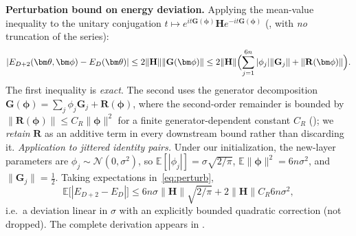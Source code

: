 \documentclass[11pt]{article}
\theoremstyle{plain}
\theoremstyle{plain}
\newcommand{\bbE}{\mathbb{E}}
\begin{document}
\medskip\noindent\textbf{Perturbation bound on energy deviation.}
Applying the mean-value inequality to the unitary conjugation
$t\mapsto e^{it\mathbf{G}(\bm\phi)}\mathbf{H}e^{-it\mathbf{G}(\bm\phi)}$
(, with \emph{no} truncation of the series):
\begin{equation}\label{eq:perturb}
  |E_{D+2}(\bm\theta,\bm\phi)-E_D(\bm\theta)|
  \le 2\|\mathbf{H}\| \|\mathbf{G}(\bm\phi)\|
  \le 2\|\mathbf{H}\|\Bigl(\sum_{j=1}^{6n}|\phi_j| \|\mathbf{G}_j\|
     +\|\mathbf{R}(\bm\phi)\|\Bigr).
\end{equation}
The first inequality is \emph{exact}.  The second uses the generator
decomposition $\mathbf{G}(\bm\phi)=\sum_j\phi_j\mathbf{G}_j+\mathbf{R}(\bm\phi)$, where the
second-order remainder is bounded by $\|\mathbf{R}(\bm\phi)\|\le C_R\|\bm\phi\|^2$
for a finite generator-dependent constant $C_R$ (); we
\emph{retain} $\mathbf{R}$ as an additive term in every downstream bound rather
than discarding it.
\emph{Application to jittered identity pairs.}  Under our
initialization, the new-layer parameters are
$\phi_j\sim\mathcal{N}(0,\sigma^2)$, so $\bbE[|\phi_j|]=\sigma\sqrt{2/\pi}$,
$\bbE\|\bm\phi\|^2=6n\sigma^2$, and $\|\mathbf{G}_j\|=\tfrac12$.  Taking
expectations in~\eqref{eq:perturb},
\[
  \bbE\bigl[|E_{D+2}-E_D|\bigr]
  \le 6n\sigma\|\mathbf{H}\|\sqrt{2/\pi}
    +  2\|\mathbf{H}\| C_R 6n\sigma^2 ,
\]
i.e.\ a deviation linear in $\sigma$ with an explicitly bounded quadratic
correction (not dropped).  The complete derivation appears in
.
\end{document}
